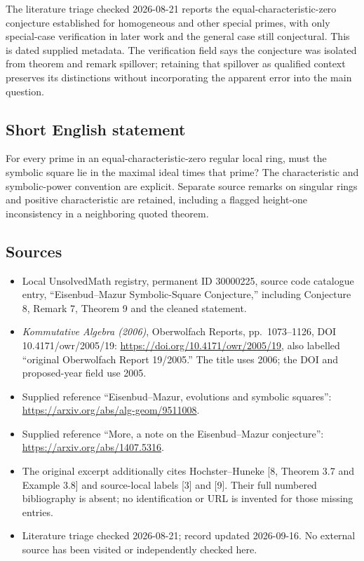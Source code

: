 \documentclass[11pt]{article}
\begin{document}
The literature triage checked 2026-08-21 reports the equal-characteristic-zero conjecture established for homogeneous and other special primes, with only special-case verification in later work and the general case still conjectural. This is dated supplied metadata. The verification field says the conjecture was isolated from theorem and remark spillover; retaining that spillover as qualified context preserves its distinctions without incorporating the apparent error into the main question.
\subsection{Short English statement}
For every prime in an equal-characteristic-zero regular local ring, must the symbolic square lie in the maximal ideal times that prime? The characteristic and symbolic-power convention are explicit. Separate source remarks on singular rings and positive characteristic are retained, including a flagged height-one inconsistency in a neighboring quoted theorem.
\subsection{Sources}
\begin{itemize}
\item Local UnsolvedMath registry, permanent ID 30000225, source code catalogue entry, ``Eisenbud--Mazur Symbolic-Square Conjecture,'' including Conjecture 8, Remark 7, Theorem 9 and the cleaned statement.
\item \emph{Kommutative Algebra (2006)}, Oberwolfach Reports, pp.\ 1073--1126, DOI 10.4171/owr/2005/19: \url{https://doi.org/10.4171/owr/2005/19}, also labelled ``original Oberwolfach Report 19/2005.'' The title uses 2006; the DOI and proposed-year field use 2005.
\item Supplied reference ``Eisenbud--Mazur, evolutions and symbolic squares'': \url{https://arxiv.org/abs/alg-geom/9511008}.
\item Supplied reference ``More, a note on the Eisenbud--Mazur conjecture'': \url{https://arxiv.org/abs/1407.5316}.
\item The original excerpt additionally cites Hochster--Huneke [8, Theorem 3.7 and Example 3.8] and source-local labels [3] and [9]. Their full numbered bibliography is absent; no identification or URL is invented for those missing entries.
\item Literature triage checked 2026-08-21; record updated 2026-09-16. No external source has been visited or independently checked here.
\end{itemize}
\end{document}
